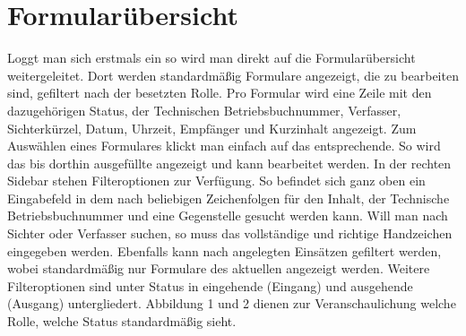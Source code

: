 \documentclass[a4paper,11pt,oneside, titlepage]{article}
\begin{document}
	\section{Formularübersicht}
	Loggt man sich erstmals ein so wird man direkt auf die Formularübersicht weitergeleitet. Dort werden standardmäßig Formulare angezeigt, die zu bearbeiten sind, gefiltert nach der besetzten Rolle.
	Pro Formular wird eine Zeile mit den dazugehörigen Status, der Technischen Betriebsbuchnummer, Verfasser, Sichterkürzel, Datum, Uhrzeit, Empfänger und Kurzinhalt angezeigt. Zum Auswählen eines Formulares klickt man einfach auf das entsprechende. So wird das bis dorthin ausgefüllte angezeigt und kann bearbeitet werden.
	\newline
	\newline
	In der rechten Sidebar stehen Filteroptionen zur Verfügung. So befindet sich ganz oben ein Eingabefeld in dem nach beliebigen Zeichenfolgen für den Inhalt, der Technische Betriebsbuchnummer und eine Gegenstelle gesucht werden kann. Will man nach Sichter oder Verfasser suchen, so muss das vollständige und richtige Handzeichen eingegeben werden. Ebenfalls kann nach angelegten Einsätzen gefiltert werden, wobei standardmäßig nur Formulare des aktuellen angezeigt werden.
	\newline
	Weitere Filteroptionen sind unter \glqq{}Status \grqq{} in eingehende (\glqq{}Eingang\grqq{}) und ausgehende (\glqq{}Ausgang\grqq{}) untergliedert. Abbildung 1 und 2 dienen zur Veranschaulichung welche Rolle, welche Status standardmäßig sieht. 
\end{document}
